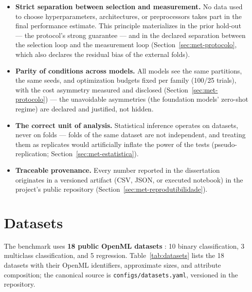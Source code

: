 \begin{itemize}
  \item \textbf{Strict separation between selection and measurement.}
    No data used to choose hyperparameters, architectures, or
    preprocessors takes part in the final performance estimate. This
    principle materializes in the prior hold-out --- the protocol's
    strong guarantee --- and in the declared separation between the
    selection loop and the measurement loop
    (Section~\ref{sec:met-protocolo}, which also declares the
    residual bias of the external folds).
  \item \textbf{Parity of conditions across models.} All models see
    the same partitions, the same seeds, and optimization budgets
    fixed per family (100/25 trials), with the cost asymmetry
    measured and disclosed (Section~\ref{sec:met-protocolo}) --- the
    unavoidable asymmetries (the foundation models' zero-shot
    regime) are declared and justified, not hidden.
  \item \textbf{The correct unit of analysis.} Statistical inference
    operates on datasets, never on folds --- folds of the same
    dataset are not independent, and treating them as replicates
    would artificially inflate the power of the tests
    (pseudo-replication; Section~\ref{sec:met-estatistica}).
  \item \textbf{Traceable provenance.} Every number reported in the
    dissertation originates in a versioned artifact (CSV, JSON, or
    executed notebook) in the project's public repository
    (Section~\ref{sec:met-reprodutibilidade}).
\end{itemize}

\section{Datasets}
\label{sec:met-datasets}

The benchmark uses \textbf{18 public OpenML datasets}
\citep{vanschoren2014}: 10 binary classification, 3 multiclass
classification, and 5 regression. Table~\ref{tab:datasets} lists the
18 datasets with their OpenML identifiers, approximate sizes, and
attribute composition; the canonical source is
\texttt{configs/\allowbreak datasets.\allowbreak yaml}, versioned in
the repository.

